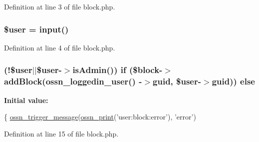 Definition at line 3 of file block.\+php.

\subsubsection[{\texorpdfstring{\$user}{$user}}]{\setlength{\rightskip}{0pt plus 5cm}\${\bf user} = {\bf input}(\textquotesingle{})}\hypertarget{block_8php_a598ca4e71b15a1313ec95f0df1027ca5}{}\label{block_8php_a598ca4e71b15a1313ec95f0df1027ca5}


Definition at line 4 of file block.\+php.

\subsubsection[{\texorpdfstring{else}{else}}]{ (!\${\bf user}$\vert$$\vert$\${\bf user}-\/$>$is\+Admin()) {\bf if} (\$block-\/$>$add\+Block({\bf ossn\+\_\+loggedin\+\_\+user}() -\/$>$guid, \${\bf user}-\/$>$guid)) else}\hypertarget{block_8php_abcb3f137f17f392258406cd4c74c4da1}{}\label{block_8php_abcb3f137f17f392258406cd4c74c4da1}
{\bfseries Initial value\+:}
\begin{DoxyCode}
\{
    \hyperlink{ossn_8lib_8system_8php_ab3f23f23f32f50c12e7aea0ffaccaac7}{ossn\_trigger\_message}(\hyperlink{ossn_8lib_8languages_8php_a2be5d1c4b695593a9b9067b96df2150a}{ossn\_print}(\textcolor{stringliteral}{'user:block:error'}), \textcolor{stringliteral}{'error'})
\end{DoxyCode}


Definition at line 15 of file block.\+php.

